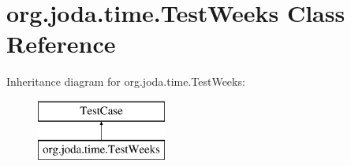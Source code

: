 \hypertarget{classorg_1_1joda_1_1time_1_1_test_weeks}{\section{org.\-joda.\-time.\-Test\-Weeks Class Reference}
\label{classorg_1_1joda_1_1time_1_1_test_weeks}
}
Inheritance diagram for org.\-joda.\-time.\-Test\-Weeks\-:\begin{figure}[H]
\begin{center}
\leavevmode
\includegraphics[height=2.000000cm]{classorg_1_1joda_1_1time_1_1_test_weeks}
\end{center}
\end{figure}

